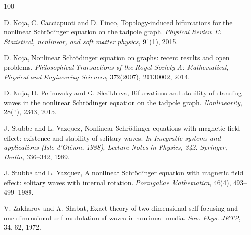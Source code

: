 \documentclass[12pt,a4paper]{amsart}
\theoremstyle{definition}
\theoremstyle{plain}
\numberwithin{equation}{section}
\begin{document}
\begin{thebibliography}{100}


{\sc D. Noja, C. Cacciapuoti and D. Finco}, Topology-induced bifurcations for the nonlinear Schrödinger equation on the tadpole graph. {\em Physical Review E: Statistical, nonlinear, and soft matter physics}, 91(1), 2015.

{\sc D. Noja}, Nonlinear Schrödinger equation on graphs: recent results and open problems. {\em Philosophical Transactions of the Royal Society A: Mathematical, Physical and Engineering Sciences}, 372(2007), 20130002, 2014.


{\sc D. Noja, D. Pelinovsky and G. Shaikhova}, Bifurcations and stability of standing waves in the nonlinear Schrödinger equation on the tadpole graph. {\em Nonlinearity}, 28(7), 2343, 2015.


{\sc J. Stubbe and L. Vazquez}, Nonlinear Schrödinger equations with magnetic field effect: existence and stability of solitary waves. {\em In Integrable systems and applications (Isle d'Oléron, 1988), Lecture Notes in Physics, 342. Springer, Berlin}, 336--342, 1989.

{\sc J. Stubbe and L. Vazquez}, A nonlinear Schrödinger equation with magnetic field effect: solitary waves with internal rotation. {\em Portugaliae Mathematica}, 46(4), 493--499, 1989.

{\sc V. Zakharov and A. Shabat}, Exact theory of two-dimensional self-focusing and one-dimensional self-modulation of waves in nonlinear media. {\em Sov. Phys. JETP}, 34, 62, 1972.

\end{thebibliography}
\end{document}
